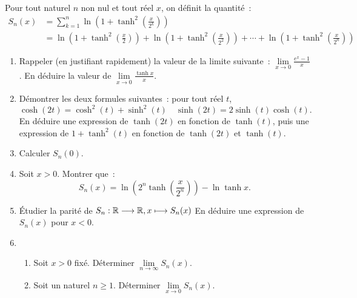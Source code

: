 \begin{exercice}
  Pour tout naturel \(n\) non nul et tout réel \(x\), on définit la quantité~:
  \begin{align}
    S_n(x) &= \sum_{k=1}^n \ln\left(1+ \tanh^2\left(\frac{x}{2^k}\right)\right) 
    \\
    &= \ln\left(1+ \tanh^2\left(\frac{x}{2}\right)\right) + \ln\left(1+ 
    \tanh^2\left(\frac{x}{2^2}\right)\right) + \cdots + \ln\left(1+ 
  \tanh^2\left(\frac{x}{2^n}\right)\right) \end{align}
  \begin{enumerate}
    \item Rappeler (en justifiant rapidement) la valeur de la limite suivante~: 
      \(\lim\limits_{x\to 0} \frac{e^x-1}{x}\). En déduire la valeur de 
      \(\lim\limits_{x\to 0} \frac{\tanh x}{x}\).
    \item Démontrer les deux formules suivantes~: pour tout réel \(t\),
      \begin{equation}
        \cosh(2t) = \cosh^2(t) + \sinh^2(t) \quad \sinh(2t) = 2\sinh(t)\cosh(t).
      \end{equation}
      En déduire une expression de \(\tanh(2t)\) en fonction de \(\tanh(t)\), 
      puis une expression de \(1+\tanh^2(t)\) en fonction de \(\tanh(2t)\) et 
      \(\tanh(t)\).
    \item Calculer \(S_n(0)\).
    \item Soit \(x >0\). Montrer que~:
      \begin{equation}
        S_n(x) = \ln\left(2^n \tanh\left(\frac{x}{2^n}\right)\right) - \ln \tanh 
        x.
      \end{equation}
    \item Étudier la parité de \(S_n:\mathbb{R} \longrightarrow{} \mathbb{R}, x \longmapsto{} S_n(x)\) En déduire 
    une expression de \(S_n(x)\) pour \(x<0\). \item \begin{enumerate}
        \item Soit \(x>0\) fixé. Déterminer \(\lim\limits_{n\to\infty} S_n(x)\).
        \item Soit un naturel \(n \geq 1\). Déterminer \(\lim\limits_{x\to 0} 
          S_n(x)\).
    \end{enumerate}
  \end{enumerate}
\end{exercice}

